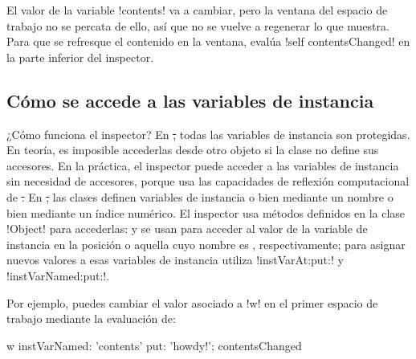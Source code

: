 \documentclass[a4paper,10pt,twoside]{book}
\begin{document}

El valor de la variable \ct!contents! va a cambiar, pero la ventana
del espacio de trabajo no se percata de ello, así que no se vuelve a
regenerar lo que muestra.  Para que se refresque el contenido en la
ventana, evalúa \ct!self contentsChanged!  en la parte inferior del
inspector.

\subsection{Cómo se accede a las variables de instancia}


¿Cómo funciona el inspector?  En \st, todas las variables de instancia
son protegidas.  En teoría, es imposible accederlas desde otro objeto
si la clase no define sus accesores.  En la práctica, el
inspector puede acceder a las variables de instancia sin necesidad de
accesores, porque usa las capacidades de reflexión computacional de
\st.  En \st, las clases definen variables de instancia o bien
mediante un nombre o bien mediante un índice numérico.  El inspector
usa métodos definidos en la clase \ct!Object! para accederlas:
 y  se
usan para acceder al valor de la variable de instancia en la posición
 o aquella cuyo nombre es ,
respectivamente; para asignar nuevos valores a esas variables de
instancia utiliza \ct!instVarAt:put:! y \ct!instVarNamed:put:!.
 
 

Por ejemplo, puedes cambiar el valor asociado a \ct!w! en el primer
espacio de trabajo mediante la evaluación de:
\begin{code}{}
w instVarNamed: 'contents' put: 'howdy!'; contentsChanged
\end{code}

\end{document}
